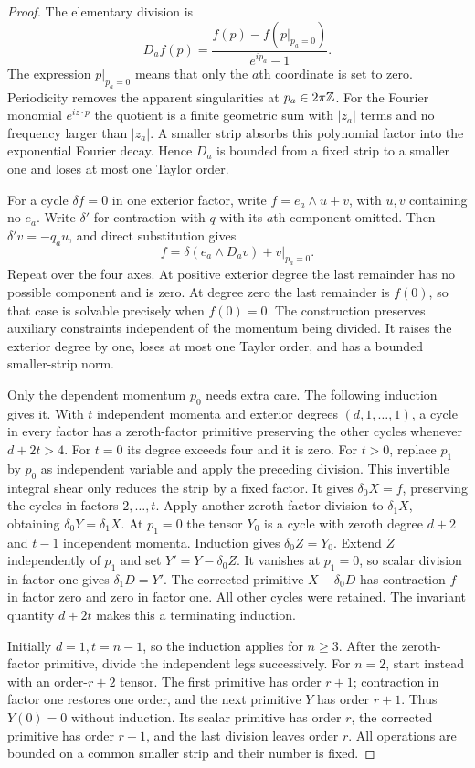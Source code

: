 \begin{proof}
The elementary division is
\[
 D_af(p)=\frac{f(p)-f(p|_{p_a=0})}{e^{ip_a}-1}.
\]
The expression $p|_{p_a=0}$ means that only the $a$th coordinate is set
to zero. Periodicity removes the apparent singularities at $p_a\in2\pi\mathbb Z$.
For the Fourier monomial $e^{iz\cdot p}$ the quotient is a finite
geometric sum with $|z_a|$ terms and no frequency larger
than $|z_a|$. A smaller strip absorbs this polynomial factor into the
exponential Fourier decay. Hence $D_a$ is bounded from a fixed strip to
a smaller one and loses at most one Taylor order.

For a cycle $\delta f=0$ in one exterior factor, write
$f=e_a\wedge u+v$, with $u,v$ containing no $e_a$. Write $\delta'$ for contraction with $q$ with its $a$th component omitted.
Then $\delta'v=-q_au$, and direct substitution gives
\[
 f=\delta(e_a\wedge D_av)+v|_{p_a=0}.
\]
Repeat over the four axes. At positive exterior degree the last
remainder has no possible component and is zero. At degree zero the
last remainder is $f(0)$, so that case is solvable precisely when
$f(0)=0$. The construction preserves auxiliary constraints independent
of the momentum being divided. It raises the exterior degree by one,
loses at most one Taylor order, and has a bounded smaller-strip norm.

Only the dependent momentum $p_0$ needs extra care. The following
induction gives it. With $t$ independent momenta and exterior degrees
$(d,1,\ldots,1)$, a cycle in every factor has a zeroth-factor primitive
preserving the other cycles whenever $d+2t>4$.
For $t=0$ its degree exceeds four and it is zero. For $t>0$, replace
$p_1$ by $p_0$ as independent variable and apply the preceding division.
This invertible integral shear only reduces the strip by a fixed factor.
It gives $\delta_0X=f$, preserving the cycles in factors $2,\ldots,t$.
Apply another zeroth-factor division to $\delta_1X$, obtaining
$\delta_0Y=\delta_1X$. At $p_1=0$ the tensor $Y_0$ is a cycle with
zeroth degree $d+2$ and $t-1$ independent momenta. Induction gives
$\delta_0Z=Y_0$. Extend $Z$ independently of $p_1$ and set
$Y'=Y-\delta_0Z$. It vanishes at $p_1=0$, so scalar division in factor
one gives $\delta_1D=Y'$. The corrected primitive
$X-\delta_0D$ has contraction $f$ in factor zero and zero in factor one.
All other cycles were retained. The invariant quantity $d+2t$ makes
this a terminating induction.

Initially $d=1,t=n-1$, so the induction applies for $n\ge3$.
After the zeroth-factor primitive, divide the independent legs successively.
For $n=2$, start instead with an order-$r+2$ tensor. The first primitive has
order $r+1$; contraction in factor one restores one order, and the next
primitive $Y$ has order $r+1$. Thus $Y(0)=0$ without induction. Its scalar
primitive has order $r$, the corrected primitive has order $r+1$, and the
last division leaves order $r$. All operations are bounded on a common
smaller strip and their number is fixed.


\end{proof}
